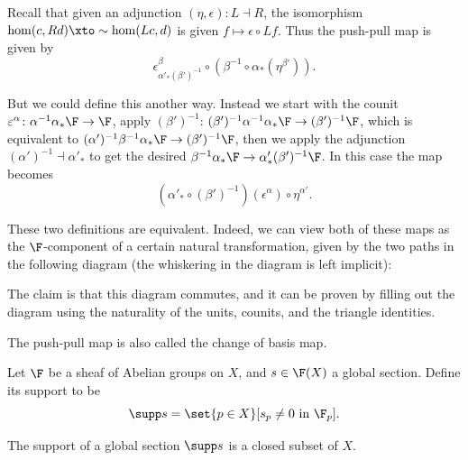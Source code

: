 Recall that given an adjunction $(\eta,\epsilon)\colon L\dashv R$, the isomorphism $\hom(c,Rd)\xto\sim\hom(Lc,d)$ is given $f\mapsto \epsilon\circ Lf$.
Thus the push-pull map is given by
$$ \epsilon^\beta_{\alpha'_*(\beta')^{-1}}\circ(\beta^{-1}\circ\alpha_*(\eta^{\beta'})) . $$

But we could define this another way.
Instead we start with the counit $\epsilon^\alpha\colon\alpha^{-1}\alpha_*\F\to\F$, apply $(\beta')^{-1}$: $(\beta')^{-1}\alpha^{-1}\alpha_*\F\to(\beta')^{-1}\F$,
which is equivalent to $(\alpha')^{-1}\beta^{-1}\alpha_*\F\to(\beta')^{-1}\F$, then we apply the adjunction $(\alpha')^{-1}\dashv\alpha'_*$ to get the desired
$\beta^{-1}\alpha_*\F\to\alpha'_*(\beta')^{-1}\F$.
In this case the map becomes
$$ (\alpha'_*\circ(\beta')^{-1})(\epsilon^\alpha)\circ\eta^{\alpha'} . $$

These two definitions are equivalent.
Indeed, we can view both of these maps as the $\F$-component of a certain natural transformation, given by the two paths in the following diagram (the whiskering in the diagram
is left implicit):


The claim is that this diagram commutes, and it can be proven by filling out the diagram using the naturality of the units, counits, and the triangle identities.

The push-pull map is also called the {\emphcolor change of basis map}.

\bdefn

    Let $\F$ be a sheaf of Abelian groups on $X$, and $s\in\F(X)$ a global section.
    Define its {\emphcolor support} to be
    $$ \supp s = \set{p\in X}[s_p\neq0\hbox{ in $\F_p$}] . $$

\edefn

\bprop

    The support of a global section $\supp s$ is a closed subset of $X$.

